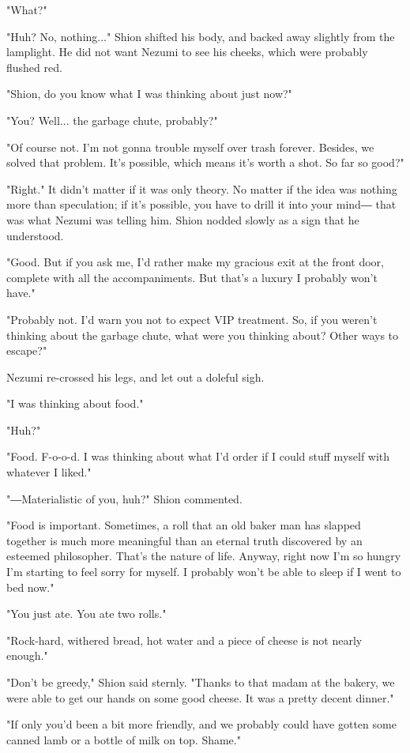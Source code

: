 "What?"

"Huh? No, nothing..." Shion shifted his body, and backed away slightly
from the lamplight. He did not want Nezumi to see his cheeks, which were
probably flushed red.

"Shion, do you know what I was thinking about just now?"

"You? Well... the garbage chute, probably?"

"Of course not. I'm not gonna trouble myself over trash forever.
Besides, we solved that problem. It's possible, which means it's worth a
shot. So far so good?"

"Right." It didn't matter if it was only theory. No matter if the idea
was nothing more than speculation; if it's possible, you have to drill
it into your mind― that was what Nezumi was telling him. Shion nodded
slowly as a sign that he understood.

"Good. But if you ask me, I'd rather make my gracious exit at the front
door, complete with all the accompaniments. But that's a luxury I
probably won't have."

"Probably not. I'd warn you not to expect VIP treatment. So, if you
weren't thinking about the garbage chute, what were you thinking about?
Other ways to escape?"

Nezumi re-crossed his legs, and let out a doleful sigh.

"I was thinking about food."

"Huh?"

"Food. F-o-o-d. I was thinking about what I'd order if I could stuff
myself with whatever I liked."

"―Materialistic of you, huh?" Shion commented.

"Food is important. Sometimes, a roll that an old baker man has slapped
together is much more meaningful than an eternal truth discovered by an
esteemed philosopher. That's the nature of life. Anyway, right now I'm
so hungry I'm starting to feel sorry for myself. I probably won't be
able to sleep if I went to bed now."

"You just ate. You ate two rolls."

"Rock-hard, withered bread, hot water and a piece of cheese is not
nearly enough."

"Don't be greedy," Shion said sternly. "Thanks to that madam at the
bakery, we were able to get our hands on some good cheese. It was a
pretty decent dinner."

"If only you'd been a bit more friendly, and we probably could have
gotten some canned lamb or a bottle of milk on top. Shame."

